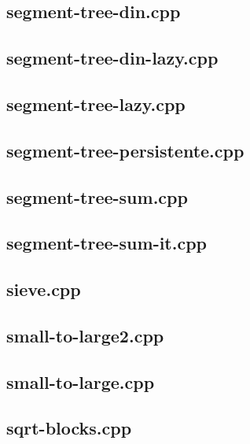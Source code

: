 \documentclass[a4paper,12pt]{article}
\begin{document}
\subsection{segment-tree-din.cpp}


\subsection{segment-tree-din-lazy.cpp}


\subsection{segment-tree-lazy.cpp}


\subsection{segment-tree-persistente.cpp}


\subsection{segment-tree-sum.cpp}


\subsection{segment-tree-sum-it.cpp}


\subsection{sieve.cpp}


\subsection{small-to-large2.cpp}


\subsection{small-to-large.cpp}


\subsection{sqrt-blocks.cpp}

\end{document}
